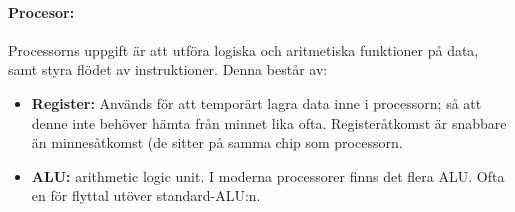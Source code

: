 \documentclass[a4paper]{article}
\begin{document}
\paragraph{Procesor:} Processorns uppgift är att utföra logiska och aritmetiska funktioner på data, samt styra flödet av instruktioner. Denna består av:
\begin{itemize}
\item \textbf{Register:} Används för att temporärt lagra data inne i processorn; så att denne inte behöver hämta från minnet lika ofta. Registeråtkomst är snabbare än minnesåtkomst (de sitter på samma chip som processorn.
\item \textbf{ALU:} arithmetic logic unit. I moderna processorer finns det flera ALU. Ofta en för flyttal utöver standard-ALU:n.
\end{itemize}
\end{document}
